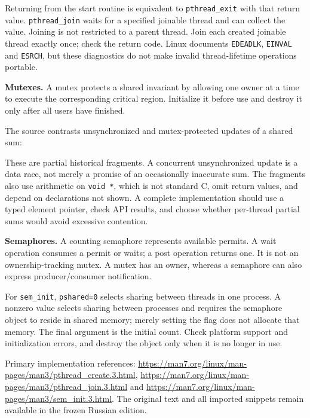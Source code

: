 {\par Returning from the start routine is equivalent to \texttt{pthread\_exit} with that return value. \texttt{pthread\_join} waits for a specified joinable thread and can collect the value. Joining is not restricted to a parent thread. Join each created joinable thread exactly once; check the return code. Linux documents \texttt{EDEADLK}, \texttt{EINVAL} and \texttt{ESRCH}, but these diagnostics do not make invalid thread-lifetime operations portable.
\par\textbf{Mutexes.} A mutex protects a shared invariant by allowing one owner at a time to execute the corresponding critical region. Initialize it before use and destroy it only after all users have finished.

\par The source contrasts unsynchronized and mutex-protected updates of a shared sum:


\par These are partial historical fragments. A concurrent unsynchronized update is a data race, not merely a promise of an occasionally inaccurate sum. The fragments also use arithmetic on \texttt{void *}, which is not standard C, omit return values, and depend on declarations not shown. A complete implementation should use a typed element pointer, check API results, and choose whether per-thread partial sums would avoid excessive contention.
\par\textbf{Semaphores.} A counting semaphore represents available permits. A wait operation consumes a permit or waits; a post operation returns one. It is not an ownership-tracking mutex. A mutex has an owner, whereas a semaphore can also express producer/consumer notification.


\par For \texttt{sem\_init}, \texttt{pshared=0} selects sharing between threads in one process. A nonzero value selects sharing between processes and requires the semaphore object to reside in shared memory; merely setting the flag does not allocate that memory. The final argument is the initial count. Check platform support and initialization errors, and destroy the object only when it is no longer in use.
\par Primary implementation references: \url{https://man7.org/linux/man-pages/man3/pthread_create.3.html}, \url{https://man7.org/linux/man-pages/man3/pthread_join.3.html} and \url{https://man7.org/linux/man-pages/man3/sem_init.3.html}. The original text and all imported snippets remain available in the frozen Russian edition.
}

